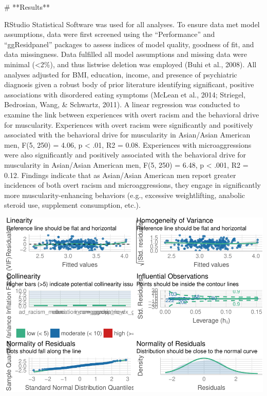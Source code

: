 \documentclass[
  12pt,
]{article}
\begin{document}
\begin{centering}
# **Results**
\end{centering}

RStudio Statistical Software was used for all analyses. To ensure data
met model assumptions, data were first screened using the
``Performance'' and ``ggResidpanel'' packages to assess indices of model
quality, goodness of fit, and data missingness. Data fulfilled all model
assumptions and missing data were minimal (\textless2\%), and thus
listwise deletion was employed (Buhi et al., 2008). All analyses
adjusted for BMI, education, income, and presence of psychiatric
diagnosis given a robust body of prior literature identifying
significant, positive associations with disordered eating symptoms
(McLean et al., 2014; Striegel, Bedrosian, Wang, \& Schwartz, 2011). A
linear regression was conducted to examine the link between experiences
with overt racism and the behavioral drive for muscularity. Experiences
with overt racism were significantly and positively associated with the
behavioral drive for muscularity in Asian/Asian American men, F(5, 250)
= 4.06, p \textless{} .01, R2 = 0.08. Experiences with microaggressions
were also significantly and positively associated with the behavioral
drive for muscularity in Asian/Asian American men, F(5, 250) = 6.48, p
\textless{} .001, R2 = 0.12. Findings indicate that as Asian/Asian
American men report greater incidences of both overt racism and
microaggressions, they engage in significantly more
muscularity-enhancing behaviors (e.g., excessive weightlifting, anabolic
steroid use, supplement consumption, etc.).

\includegraphics{final_project_files/figure-latex/model_assumptions-1.pdf}
\end{document}

